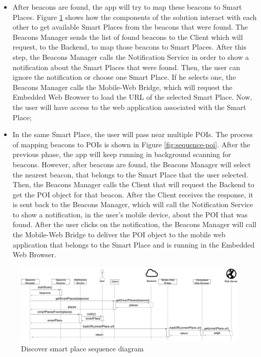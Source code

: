 \begin{itemize}
\item After beacons are found, the app will try to map
these beacons to Smart Places. Figure
\ref{fig:sequence-smart-places} shows how the components
of the solution interact with each other to get
available Smart Places from the beacons that were found.
The Beacons Manager sends the list of found beacons
to the Client which will request, to the Backend,
to map those beacons to Smart Places.
After this step, the Beacons Manager calls the
Notification Service in order to show a notification
about the Smart Places that were found.
Then, the user can ignore the notification or
choose one Smart Place. If he selects one,
the Beacons Manager calls the Mobile-Web Bridge,
which will request the Embedded Web Browser to load
the URL of the selected Smart Place. Now, the user
will have access to the web application associated
with the Smart Place;
\item In the same Smart Place, the user will
pass near multiple POIs. The process of mapping
beacons to POIs is shown in Figure
\ref{fig:sequence-poi}.
After the previous
phase, the app will keep running in background
scanning for beacons. However, after beacons
are found, the Beacons Manager will select the
nearest beacon, that belongs to the Smart Place
that the user selected. Then, the Beacons
Manager calls the Client that will request
the Backend to get the POI object for that
beacon. After the Client receives the response,
it is sent back to the Beacons Manager, which will
call the Notification Service to show a notification,
in the user's mobile device, about the POI that was
found. After the user clicks on the notification,
the Beacons Manager will call the Mobile-Web
Bridge to deliver the POI object to the mobile
web application that belongs to the Smart Place
and is running in the Embedded Web Browser.
\end{itemize}

\begin{figure}[!ht]
  \centering
    \includegraphics[width=1\textwidth]{img/smart-places-sequence}
    \caption{Discover smart place sequence diagram}
    \label{fig:sequence-smart-places}
\end{figure}

